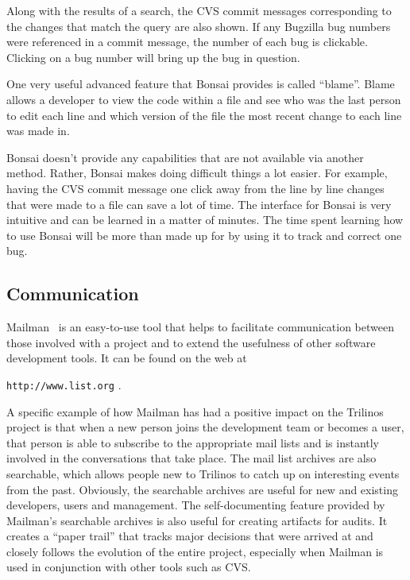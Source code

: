 \documentclass[12pt,relax]{article}
\newcommand{\InlineDirectory}[1]{
  {\hspace{0.01 in}} {\tt #1} {\hspace{0.01 in}}}
\begin{document}
Along with the results of a search, the CVS commit messages corresponding to 
the changes that match the query are also shown.  If any Bugzilla bug numbers 
were referenced in a commit message, the number of each bug is clickable.  
Clicking on a bug number will bring up the bug in question.

One very useful advanced feature that Bonsai provides is called ``blame''.  
Blame allows a developer to view the code within a file and see who was the 
last person to edit each line and which version of the file 
the most recent change to each line was made in.

Bonsai doesn't 
provide any capabilities that are not available via another method.  
Rather, Bonsai makes doing difficult things a lot easier.
For example, having the CVS commit message one click away from the line 
by line changes that
were made to a file can save a lot of time.  
The interface for Bonsai is very intuitive and can be learned in a matter of 
minutes.  The time spent learning how to use Bonsai will be more than made up 
for by using it to track and correct one bug.

\subsection{Communication}

Mailman~\cite{Mailman} is an easy-to-use tool that helps to facilitate 
communication between
those involved with a project and to extend the usefulness of other 
software development tools.  It can be found on the web at 
\InlineDirectory{http://www.list.org}.  

A specific example of how Mailman 
has had a positive impact on the Trilinos project is that when a new person
joins the development team or becomes a user, that person is able to 
subscribe to the appropriate mail lists and is instantly involved in the 
conversations that take place.  The mail list archives are also searchable, 
which allows people new to Trilinos to catch up on interesting events from the 
past.  Obviously, the searchable archives are useful for new and existing 
developers, users and management.  The self-documenting feature provided 
by Mailman's searchable archives is also useful for creating artifacts for 
audits.  It creates a ``paper trail'' that tracks major decisions that were 
arrived at and closely follows 
the evolution of the entire project, especially when Mailman is used in 
conjunction with other tools such as CVS.
\end{document}
